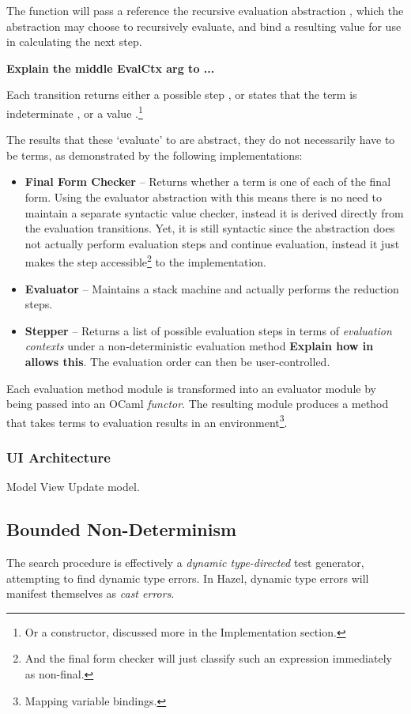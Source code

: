 The  function will pass a reference the recursive evaluation abstraction , which the abstraction may choose to recursively evaluate, and bind a resulting value for use in calculating the next step.

\textbf{Explain the middle EvalCtx arg to ...}

Each transition returns either a possible step , or states that the term is indeterminate , or a value .\footnote{Or a constructor, discussed more in the Implementation section.}

The results that these `evaluate' to are abstract, they do not necessarily have to be terms, as demonstrated by the following implementations:
\begin{itemize}
\item \textbf{Final Form Checker} -- Returns whether a term is one of each of the final form. Using the evaluator abstraction with this means there is no need to maintain a separate syntactic value checker, instead it is derived directly from the evaluation transitions. Yet, it is still syntactic since the abstraction does not actually perform evaluation steps and continue evaluation, instead it just makes the step accessible\footnote{And the final form checker will just classify such an expression immediately as non-final.} to the implementation.
\item \textbf{Evaluator} -- Maintains a stack machine and actually performs the reduction steps.
\item \textbf{Stepper} -- Returns a list of possible evaluation steps in terms of \textit{evaluation contexts} under a non-deterministic evaluation method \textbf{Explain how  in  allows this}. The evaluation order can then be user-controlled. 
\end{itemize}
Each evaluation method module is transformed into an evaluator module by being passed into an OCaml \textit{functor}. The resulting module produces a  method that takes terms to evaluation results in an environment\footnote{Mapping variable bindings.}.

\subsubsection{UI Architecture}\label{sec:HazelUIArchitecture}
Model View Update model.

\subsection{Bounded Non-Determinism}\label{sec:Nondeterminism}
The search procedure \cite{SearchProc} is effectively a \textit{dynamic type-directed} test generator, attempting to find dynamic type errors. In Hazel, dynamic type errors will manifest themselves as \textit{cast errors}.

